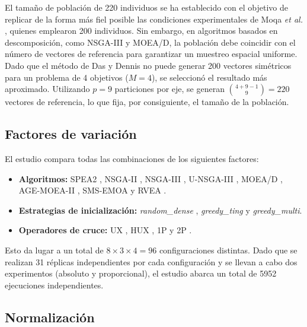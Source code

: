 El tamaño de población de 220 individuos se ha establecido con el objetivo de replicar de la forma más fiel posible las condiciones experimentales de Moqa \textit{et al.} \cite{moqa2022assessing}, quienes emplearon 200 individuos. Sin embargo, en algoritmos basados en descomposición, como NSGA-III \cite{deb2013evolutionary} y MOEA/D, la población debe coincidir con el número de vectores de referencia para garantizar un muestreo espacial uniforme. Dado que el método de Das y Dennis \cite{das1998normal} no puede generar 200 vectores simétricos para un problema de 4 objetivos ($M=4$), se seleccionó el resultado más aproximado. Utilizando $p=9$ particiones por eje, se generan $\binom{4+9-1}{9} = 220$ vectores de referencia, lo que fija, por consiguiente, el tamaño de la población.

\subsection{Factores de variación}

El estudio compara todas las combinaciones de los siguientes factores:

\begin{itemize}
    \item \textbf{Algoritmos:} SPEA2 \cite{zitzler2001spea2}, NSGA-II \cite{deb2002fast}, NSGA-III \cite{deb2013evolutionary}, U-NSGA-III \cite{seada2015unified}, MOEA/D \cite{zhang2007moea}, AGE-MOEA-II \cite{panichella2022adaptive}, SMS-EMOA \cite{beume2007sms} y RVEA \cite{cheng2016reference}.
    \item \textbf{Estrategias de inicialización:} \textit{random\_dense} \cite{ting2010multi}, \textit{greedy\_ting} \cite{ting2010multi} y \textit{greedy\_multi}.
    \item \textbf{Operadores de cruce:} UX \cite{syswerda1989uniform}, HUX \cite{eshelman1991chc}, 1P y 2P \cite{holland1975adaptation}.
\end{itemize}

Esto da lugar a un total de $8 \times 3 \times 4 = 96$ configuraciones distintas. Dado que se realizan 31 réplicas independientes \cite{granado2020multiobjective} por cada configuración y se llevan a cabo dos experimentos (absoluto y proporcional), el estudio abarca un total de 5952 ejecuciones independientes.

\subsection{Normalización}

